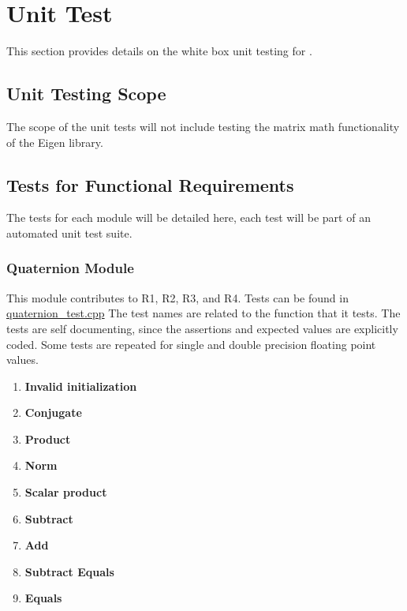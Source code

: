 \documentclass[12pt, titlepage]{article}
\newcommand{\UTthetestnum}{UT\theutestnum}
\begin{document}

\section{Unit Test} \label{sec:unit_test}

This section provides details on the white box unit testing for \progname{}.

\subsection{Unit Testing Scope}

The scope of the unit tests will not include testing the matrix math functionality of the Eigen
library.

\subsection{Tests for Functional Requirements}

The tests for each module will be detailed here, each test will be part of an automated unit test
suite.

\subsubsection{Quaternion Module}

This module contributes to R1, R2, R3, and R4. Tests can be found in
\href{https://github.com/adrian-soch/attitude_check/blob/main/test/quaternion_test.cpp}{quaternion\_test.cpp}
The test names are related to the function that it tests. The tests are self documenting, since the
assertions and expected values are explicitly coded. Some tests are repeated for single and double
precision floating point values.

\begin{enumerate}
  \item[\refstepcounter{utestnum} \UTthetestnum:] \textbf{Invalid initialization}
  \item[\refstepcounter{utestnum} \UTthetestnum:] \textbf{Conjugate}
  \item[\refstepcounter{utestnum} \UTthetestnum:] \textbf{Product}
  \item[\refstepcounter{utestnum} \UTthetestnum:] \textbf{Norm}
  \item[\refstepcounter{utestnum} \UTthetestnum:] \textbf{Scalar product}
  \item[\refstepcounter{utestnum} \UTthetestnum:] \textbf{Subtract}
  \item[\refstepcounter{utestnum} \UTthetestnum:] \textbf{Add}
  \item[\refstepcounter{utestnum} \UTthetestnum:] \textbf{Subtract Equals}
  \item[\refstepcounter{utestnum} \UTthetestnum:] \textbf{Equals}
\end{enumerate}
\end{document}
